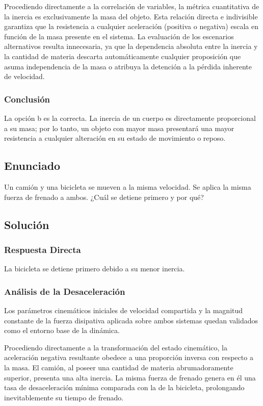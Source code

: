 \documentclass[12pt, a4paper]{article}
\begin{document}
Procediendo directamente a la correlación de variables, la métrica cuantitativa de la inercia es exclusivamente la masa del objeto. Esta relación directa e indivisible garantiza que la resistencia a cualquier aceleración (positiva o negativa) escala en función de la masa presente en el sistema. La evaluación de los escenarios alternativos resulta innecesaria, ya que la dependencia absoluta entre la inercia y la cantidad de materia descarta automáticamente cualquier proposición que asuma independencia de la masa o atribuya la detención a la pérdida inherente de velocidad.

\subsubsection*{Conclusión}
La opción b es la correcta. La inercia de un cuerpo es directamente proporcional a su masa; por lo tanto, un objeto con mayor masa presentará una mayor resistencia a cualquier alteración en su estado de movimiento o reposo.

\newpage

\subsection*{Enunciado}
Un camión y una bicicleta se mueven a la misma velocidad. Se aplica la misma fuerza de frenado a ambos. ¿Cuál se detiene primero y por qué?

\subsection*{Solución}

\subsubsection*{Respuesta Directa}
La bicicleta se detiene primero debido a su menor inercia.

\subsubsection*{Análisis de la Desaceleración}
Los parámetros cinemáticos iniciales de velocidad compartida y la magnitud constante de la fuerza disipativa aplicada sobre ambos sistemas quedan validados como el entorno base de la dinámica.

Procediendo directamente a la transformación del estado cinemático, la aceleración negativa resultante obedece a una proporción inversa con respecto a la masa. El camión, al poseer una cantidad de materia abrumadoramente superior, presenta una alta inercia. La misma fuerza de frenado genera en él una tasa de desaceleración mínima comparada con la de la bicicleta, prolongando inevitablemente su tiempo de frenado.
\end{document}
